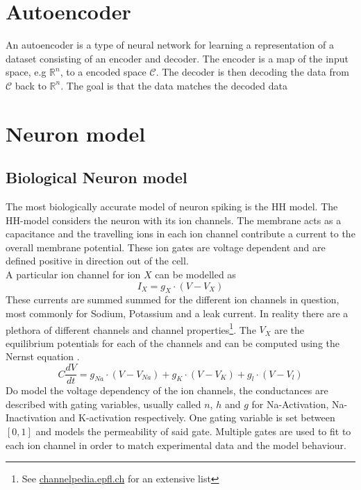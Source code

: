 \section{Autoencoder}
An autoencoder is a type of neural network for learning a representation of a dataset consisting of an encoder and decoder. The encoder is a map of the input space, e.g $\mathbb{R}^n$, to a encoded space $\mathcal{C}$. The decoder is then decoding the data from $\mathcal{C}$ back to $\mathbb{R}^n$. The goal is that the data matches the decoded data
\section{Neuron model}

\subsection{Biological Neuron model}
The most biologically accurate model of neuron spiking is the \ac{HH} model. The \ac{HH}-model considers the neuron with its ion channels. The membrane acts as a capacitance and the travelling ions in each ion channel contribute a current to the overall membrane potential. These ion gates are voltage dependent and are defined positive in direction out of the cell.\\
A particular ion channel for ion $X$ can be modelled as
\begin{equation}
	I_X= g_X \cdot (V-V_X)
\end{equation}
These currents are summed summed for the different ion channels in question, most commonly for Sodium, Potassium and a leak current. In reality there are a plethora of different channels and channel properties\footnote{See  \url{channelpedia.epfl.ch} for an extensive list}. The $V_X$ are the equilibrium potentials for each of the channels and can be computed using the Nernst equation \cite{johnston_foundations_1995}. 
\begin{equation}
	C \frac{dV}{dt} = g_{Na} \cdot (V-V_{Na}) + g_K \cdot (V-V_K) + g_l \cdot (V-V_l)
\end{equation}
Do model the voltage dependency of the ion channels, the conductances are described with gating variables, usually called $n$, $h$ and $g$ for Na-Activation, Na-Inactivation and K-activation respectively. One gating variable is set between $[0,1]$ and models the permeability of said gate. Multiple gates are used to fit to each ion channel in order to match experimental data and the model behaviour.\\
